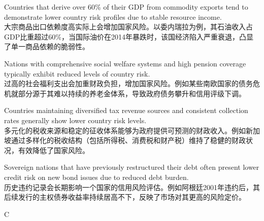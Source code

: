 \documentclass{article}
\begin{document}
        \begin{choices}
            \item Countries that derive over 60\% of their GDP from commodity exports tend to demonstrate lower country risk profiles due to stable resource income.\\ 
            大宗商品出口依赖度高实际上会增加国家风险。以委内瑞拉为例，其石油收入占GDP比重超过60\%，当国际油价在2014年暴跌时，该国经济陷入严重衰退，凸显了单一商品依赖的脆弱性。
            
            \item Nations with comprehensive social welfare systems and high pension coverage typically exhibit reduced levels of country risk.\\ 
            过高的社会福利支出会加重财政负担，增加国家风险。例如某些南欧国家的债务危机就部分源于其难以持续的养老金体系，导致政府债务攀升和信用评级下调。
            
            \item Countries maintaining diversified tax revenue sources and consistent collection rates generally show lower country risk levels.\\ 
            多元化的税收来源和稳定的征收体系能够为政府提供可预测的财政收入。例如新加坡通过多样化的税收结构（包括所得税、消费税和财产税）维持了稳健的财政状况，有效降低了国家风险。
            
            \item Sovereign nations that have previously restructured their debt often present lower credit risk on new bond issues due to reduced debt burden.\\ 
            历史违约记录会长期影响一个国家的信用风险评估。例如阿根廷2001年违约后，其后续发行的主权债券收益率持续居高不下，反映了市场对其更高的风险定价。
        \end{choices}
        
        \begin{correctanswer}
        C
        \end{correctanswer}
        
\end{document}
